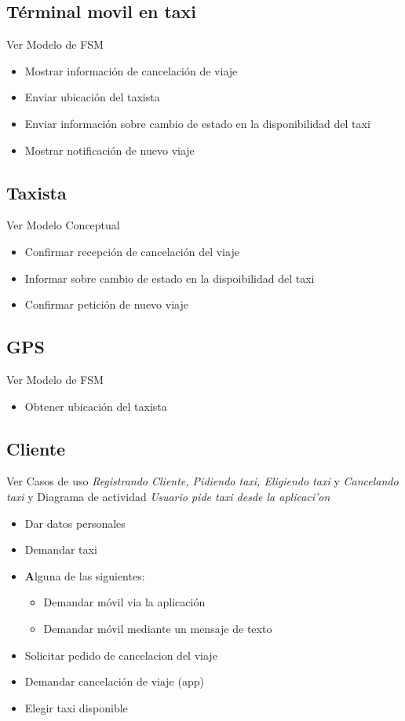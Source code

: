 \documentclass[a4paper]{article}
\begin{document}
\subsection{T\'erminal movil en taxi}
Ver Modelo de FSM
\begin{itemize}
 \item Mostrar informaci\'on de cancelaci\'on de viaje
 \item Enviar ubicaci\'on del taxista
 \item Enviar informaci\'on sobre cambio de estado en la disponibilidad del taxi
 \item Mostrar notificaci\'on de nuevo viaje
 
 \end{itemize}

\subsection{Taxista}
Ver Modelo Conceptual
\begin{itemize}
 \item Confirmar recepci\'on de cancelaci\'on del viaje
 \item Informar sobre cambio de estado en la dispoibilidad del taxi
 \item Confirmar petici\'on de nuevo viaje
\end{itemize}

\subsection{GPS}
Ver Modelo de FSM
\begin{itemize}
 \item Obtener ubicaci\'on del taxista
\end{itemize}


\subsection{Cliente}
Ver Casos de uso \textit{Registrando Cliente, Pidiendo taxi, Eligiendo taxi} y \textit{Cancelando taxi} y 
Diagrama de actividad \textit{Usuario pide taxi desde la aplicaci'on}
\begin{itemize}
\item Dar datos personales
\item Demandar taxi
\item \textbf Alguna de las siguientes:
	\begin{itemize}
		\item Demandar m\'ovil via la aplicaci\'on 
		\item Demandar m\'ovil mediante un mensaje de texto
	\end{itemize}
\item Solicitar pedido de cancelacion del viaje
\item Demandar cancelaci\'on de viaje (app)
\item Elegir taxi disponible

\end{itemize}
\end{document}
